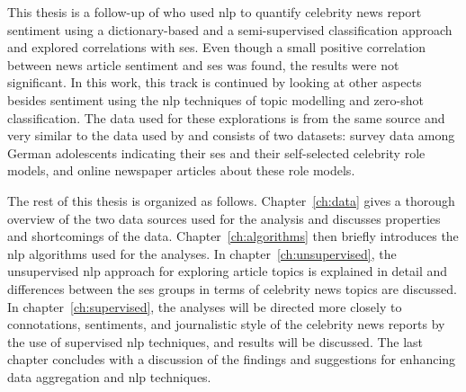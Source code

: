 This thesis is a follow-up of \textcite{fenske_using_2022} who used \gls{nlp} to quantify celebrity news report sentiment using a dictionary-based and a semi-supervised classification approach and explored correlations with \gls{ses}. Even though a small positive correlation between news article sentiment and \gls{ses} was found, the results were not significant. In this work, this track is continued by looking at other aspects besides sentiment using the \gls{nlp} techniques of topic modelling and zero-shot classification. The data used for these explorations is from the same source and very similar to the data used by \textcite{fenske_using_2022} and consists of two datasets: survey data among German adolescents indicating their \gls{ses} and their self-selected celebrity role models, and online newspaper articles about these role models.

The rest of this thesis is organized as follows. Chapter~\ref{ch:data} gives a thorough overview of the two data sources used for the analysis and discusses properties and shortcomings of the data. Chapter~\ref{ch:algorithms} then briefly introduces the \gls{nlp} algorithms used for the analyses. In chapter~\ref{ch:unsupervised}, the unsupervised \gls{nlp} approach for exploring article topics is explained in detail and differences between the \gls{ses} groups in terms of celebrity news topics are discussed. In chapter~\ref{ch:supervised}, the analyses will be directed more closely to connotations, sentiments, and journalistic style of the celebrity news reports by the use of supervised \gls{nlp} techniques, and results will be discussed. The last chapter concludes with a discussion of the findings and suggestions for enhancing data aggregation and \gls{nlp} techniques.